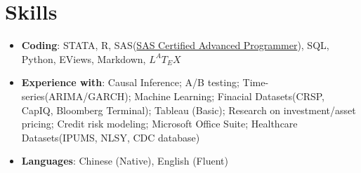 \documentclass{resume}
\begin{document}

\section{Skills}
\begin{itemize}[parsep=0.25ex]
  \item \textbf{Coding}:
    STATA, R, SAS(\href{https://www.youracclaim.com/badges/c4bce10e-7398-4203-9d11-f9c6723749a4/linked_in_profile}{SAS Certified Advanced Programmer}), SQL, Python, EViews, Markdown, $L^{A}T_{E}X$

  \item \textbf{Experience with}:
   Causal Inference; A/B testing; Time-series(ARIMA/GARCH); Machine Learning; Finacial Datasets(CRSP, CapIQ, Bloomberg Terminal); Tableau (Basic); Research on investment/asset pricing; Credit risk modeling; Microsoft Office Suite; Healthcare Datasets(IPUMS, NLSY, CDC database)
   

 \item \textbf{Languages}: 
  Chinese (Native), English (Fluent)  
 
  
\end{itemize}

\end{document}
